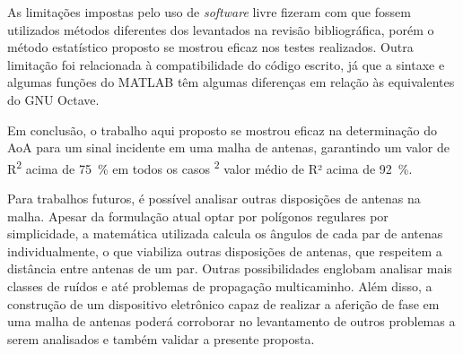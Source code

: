 As limitações impostas pelo uso de \textit{software} livre fizeram com que fossem utilizados métodos diferentes dos levantados na revisão bibliográfica, porém o método estatístico proposto se mostrou eficaz nos testes realizados.
Outra limitação foi relacionada à compatibilidade do código escrito, já que a sintaxe e algumas funções do MATLAB têm algumas diferenças em relação às equivalentes do GNU Octave.

Em conclusão, o trabalho aqui proposto se mostrou eficaz na determinação do \ac{AoA} para um sinal incidente em uma malha de antenas, garantindo um valor de R\textsuperscript{2} acima de \qty{75}{\percent} em todos os casos \textsuperscript{2} valor médio de R² acima de \qty{92}{\percent}.

Para trabalhos futuros, é possível analisar outras disposições de antenas na malha.
Apesar da formulação atual optar por polígonos regulares por simplicidade, a matemática utilizada calcula os ângulos de cada par de antenas individualmente, o que viabiliza outras disposições de antenas, que respeitem a distância entre antenas de um par.
Outras possibilidades englobam analisar mais classes de ruídos e até problemas de propagação multicaminho.
Além disso, a construção de um dispositivo eletrônico capaz de realizar a aferição de fase em uma malha de antenas poderá corroborar no levantamento de outros problemas a serem analisados e também validar a presente proposta.
